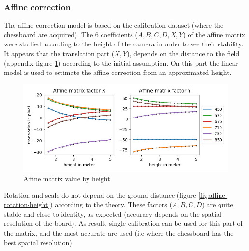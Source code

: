 \documentclass[../thesis.tex]{subfiles}
\begin{document}
    \vspace{2em}
	\subsubsection{Affine correction}
	
	The affine correction model is based on the calibration dataset (where the chessboard are acquired).
	The 6 coefficients ($A,B,C,D,X,Y$) of the affine matrix were studied according to the height of the camera in order to see their stability.
	It appears that the translation part ($X,Y$), depends on the distance to the field
	(appendix figure \ref{fig:affine-translation-height}) according to the initial assumption.
	On this part the linear model is used to estimate the affine correction from an approximated height.
	
	\begin{figure}[H]
		\centering
		\includegraphics[width=0.8\linewidth]{img/registration/affine-translation-height}
		\caption{Affine matrix value by height}
		\label{fig:affine-translation-height}
	\end{figure}

	Rotation and scale do not depend on the ground distance (figure \ref{fig:affine-rotation-height}) according to the theory.
	These factors ($A,B,C,D$) are quite stable and close to identity, as expected (accuracy depends on the spatial resolution of the board).
	As result, single calibration can be used for this part of the matrix, and the most accurate are used (i.e where the chessboard has the best spatial resolution).
	
\end{document}
